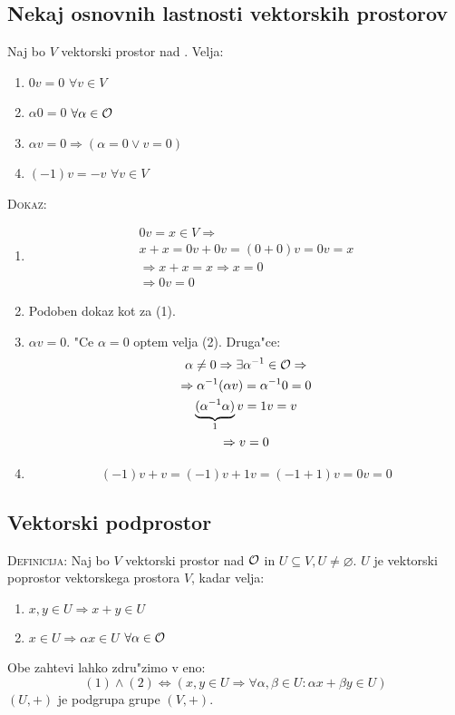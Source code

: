 \subsection{Nekaj osnovnih lastnosti vektorskih prostorov}
Naj bo $V$ vektorski prostor nad \OO. Velja:
\begin{enumerate}[(1)]
	\item $0v = 0$ \hfill $\forall v \in V$
	\item $\alpha 0 = 0$ \hfill $\forall \alpha \in \mathcal{O}$
	\item $\alpha v = 0 \Rightarrow (\alpha = 0 \lor v = 0)$
	\item $(-1)v = -v$ \hfill $\forall v \in V$
\end{enumerate}
\textsc{Dokaz:}
\begin{enumerate}[(1)]
	\item
	\begin{multline*}
		0v = x \in V \Rightarrow \\
		x + x = 0v + 0v = (0 + 0)v = 0v = x  \\
		\Rightarrow x + x = x \Rightarrow x = 0 \\
		\Rightarrow 0v = 0
	\end{multline*}
	\item Podoben dokaz kot za (1).
	\item $\alpha v = 0$. "Ce $\alpha = 0$ optem velja (2). Druga"ce:
	\begin{multline*}
		\alpha \neq 0 \Rightarrow \exists \alpha^{-1} \in \mathcal{O} \Rightarrow \\
		\Rightarrow \alpha^{-1} (\alpha v) = \alpha^{-1} 0 = 0 \\
		\underbrace{(\alpha^{-1} \alpha)}_1 v = 1v = v \\
		\Rightarrow v = 0
	\end{multline*}
	\item
	\begin{equation*}
	(-1)v + v = (-1)v + 1v = (-1 + 1) v = 0v = 0
	\end{equation*}
\end{enumerate}
%
\subsection{Vektorski podprostor}
\textsc{Definicija:} Naj bo $V$ vektorski prostor nad $\mathcal{O}$ in $U \subseteq V, U \neq \varnothing$. $U$ je vektorski poprostor vektorskega prostora $V$, kadar velja:
\begin{enumerate}[(1)]
	\item $x, y \in U \Rightarrow x + y \in U$
	\item $x \in U \Rightarrow \alpha x \in U$ \hfill $\forall \alpha \in \mathcal{O}$
\end{enumerate}
Obe zahtevi lahko zdru"zimo v eno:
\begin{equation*}
(1) \land (2) \iff (x, y \in U \Rightarrow \forall \alpha, \beta \in U: \alpha x + \beta y \in U)
\end{equation*}
$(U, +)$ je podgrupa grupe $(V, +)$.


